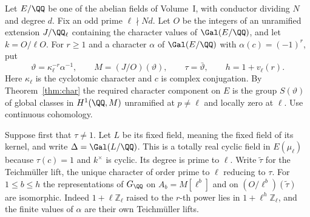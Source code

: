 \documentclass[a4paper,11pt]{article}
\theoremstyle{definition}
\theoremstyle{remark}
\newcommand{\ZZ}{\mathbb Z}\newcommand{\ord}{\operatorname{ord}}
\numberwithin{equation}{section}
\begin{document}
Let \(E/\QQ\) be one of the abelian fields of Volume~I, with
conductor dividing \(N\) and degree \(d\). Fix an odd prime
\(\ell\nmid Nd\). Let \(O\) be the integers of an unramified
extension \(J/\QQ_\ell\) containing the character values of
\(\Gal(E/\QQ)\), and let \(k=O/\ell O\). For \(r\ge1\) and a
character \(\alpha\) of \(\Gal(E/\QQ)\) with
\(\alpha(c)=(-1)^r\), put
\[
 \vartheta=\kappa_\ell^{-r}\alpha^{-1},\qquad
 M=(J/O)(\vartheta),\qquad \tau=\bar\vartheta,\qquad
 h=1+v_\ell(r).
\]
Here \(\kappa_\ell\) is the cyclotomic character and \(c\) is
complex conjugation. By Theorem~\ref{thm:char} the required
character component on \(E\) is the group \(S(\vartheta)\) of
global classes in \(H^1(\QQ,M)\) unramified at \(p\ne\ell\)
and locally zero at \(\ell\). Use continuous cohomology.

Suppose first that \(\tau\ne1\). Let \(L\) be its fixed field,
meaning the fixed field of its kernel, and write \(\Delta=\Gal(L/\QQ)\).
This is a totally real cyclic field in \(E(\mu_\ell)\) because
\(\tau(c)=1\) and \(k^\times\) is cyclic. Its degree is prime to
\(\ell\). Write \(\widetilde\tau\) for the Teichmüller lift, the
unique character of order prime to \(\ell\) reducing to \(\tau\).
For \(1\le b\le h\) the representations of \(G_\QQ\) on
\(A_b=M[\ell^b]\) and on \((O/\ell^b)(\widetilde\tau)\) are
isomorphic. Indeed \(1+\ell\ZZ_\ell\) raised to the \(r\)-th
power lies in \(1+\ell^h\ZZ_\ell\), and the finite values of
\(\alpha\) are their own Teichmüller lifts.
\end{document}

